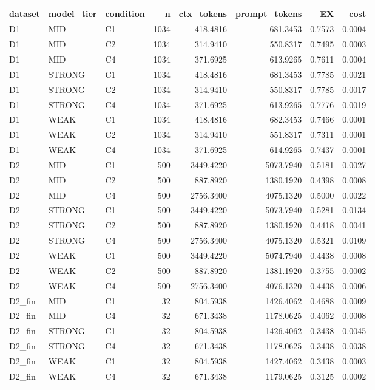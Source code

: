 \begin{tabular}{lllrrrrr}
\toprule
dataset & model\_tier & condition & n & ctx\_tokens & prompt\_tokens & EX & cost \\
\midrule
D1 & MID & C1 & 1034 & 418.4816 & 681.3453 & 0.7573 & 0.0004 \\
D1 & MID & C2 & 1034 & 314.9410 & 550.8317 & 0.7495 & 0.0003 \\
D1 & MID & C4 & 1034 & 371.6925 & 613.9265 & 0.7611 & 0.0004 \\
D1 & STRONG & C1 & 1034 & 418.4816 & 681.3453 & 0.7785 & 0.0021 \\
D1 & STRONG & C2 & 1034 & 314.9410 & 550.8317 & 0.7785 & 0.0017 \\
D1 & STRONG & C4 & 1034 & 371.6925 & 613.9265 & 0.7776 & 0.0019 \\
D1 & WEAK & C1 & 1034 & 418.4816 & 682.3453 & 0.7466 & 0.0001 \\
D1 & WEAK & C2 & 1034 & 314.9410 & 551.8317 & 0.7311 & 0.0001 \\
D1 & WEAK & C4 & 1034 & 371.6925 & 614.9265 & 0.7437 & 0.0001 \\
D2 & MID & C1 & 500 & 3449.4220 & 5073.7940 & 0.5181 & 0.0027 \\
D2 & MID & C2 & 500 & 887.8920 & 1380.1920 & 0.4398 & 0.0008 \\
D2 & MID & C4 & 500 & 2756.3400 & 4075.1320 & 0.5000 & 0.0022 \\
D2 & STRONG & C1 & 500 & 3449.4220 & 5073.7940 & 0.5281 & 0.0134 \\
D2 & STRONG & C2 & 500 & 887.8920 & 1380.1920 & 0.4418 & 0.0041 \\
D2 & STRONG & C4 & 500 & 2756.3400 & 4075.1320 & 0.5321 & 0.0109 \\
D2 & WEAK & C1 & 500 & 3449.4220 & 5074.7940 & 0.4438 & 0.0008 \\
D2 & WEAK & C2 & 500 & 887.8920 & 1381.1920 & 0.3755 & 0.0002 \\
D2 & WEAK & C4 & 500 & 2756.3400 & 4076.1320 & 0.4438 & 0.0006 \\
D2\_fin & MID & C1 & 32 & 804.5938 & 1426.4062 & 0.4688 & 0.0009 \\
D2\_fin & MID & C4 & 32 & 671.3438 & 1178.0625 & 0.4062 & 0.0008 \\
D2\_fin & STRONG & C1 & 32 & 804.5938 & 1426.4062 & 0.3438 & 0.0045 \\
D2\_fin & STRONG & C4 & 32 & 671.3438 & 1178.0625 & 0.3438 & 0.0038 \\
D2\_fin & WEAK & C1 & 32 & 804.5938 & 1427.4062 & 0.3438 & 0.0003 \\
D2\_fin & WEAK & C4 & 32 & 671.3438 & 1179.0625 & 0.3125 & 0.0002 \\
\bottomrule
\end{tabular}
